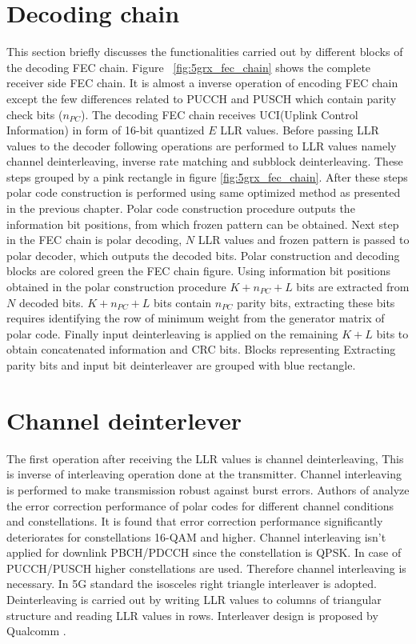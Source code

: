 \section{Decoding chain}
This section briefly discusses the functionalities carried out by different blocks of the decoding FEC chain. Figure ~\ref{fig:5grx_fec_chain} shows the complete receiver side FEC chain. It is almost a inverse operation of encoding FEC chain except the few differences related to PUCCH and PUSCH which contain parity check bits ($ n_{PC} $). The decoding FEC chain receives UCI(Uplink Control Information) in form of 16-bit quantized $ E $ LLR values. Before passing LLR values to the decoder following operations are performed to LLR values namely channel deinterleaving, inverse rate matching and subblock deinterleaving. These steps grouped by a pink rectangle in figure \ref{fig:5grx_fec_chain}. After these steps polar code construction is performed using same optimized method as presented in the previous chapter. Polar code construction procedure outputs the information bit positions, from which frozen pattern can be obtained. Next step in the FEC chain is polar decoding, $ N $ LLR values and frozen pattern is passed to polar decoder, which outputs the decoded bits. Polar construction and decoding blocks are colored green the FEC chain figure. Using information bit positions obtained in the polar construction procedure $ K + n_{PC} + L $ bits are extracted from $ N $ decoded bits. $ K + n_{PC} + L $ bits contain $ n_{PC} $ parity bits, extracting these bits requires identifying the row of minimum weight from the generator matrix of polar code. Finally input deinterleaving is applied on the remaining $ K +  L $ bits to obtain concatenated information and CRC bits. Blocks representing Extracting parity bits and input bit deinterleaver are grouped with blue rectangle.

\section{Channel deinterlever}
The first operation after receiving the LLR values is channel deinterleaving, This is inverse of interleaving operation done at the transmitter. Channel interleaving is performed to make transmission robust against burst errors. Authors of \cite{3gpp.TSG-RAN_WG1} analyze the error correction performance of polar codes for different channel conditions and constellations. It is found that error correction performance significantly deteriorates for constellations 16-QAM and higher. Channel interleaving isn't applied for downlink PBCH/PDCCH since the constellation is QPSK. In case of PUCCH/PUSCH higher constellations are used. Therefore channel interleaving is necessary. In 5G standard  the isosceles right triangle interleaver is adopted. Deinterleaving is carried out by writing LLR values to columns of triangular structure and reading LLR values in rows. Interleaver design is proposed by Qualcomm \cite{3gpp.TSG-RAN_WG1}.


